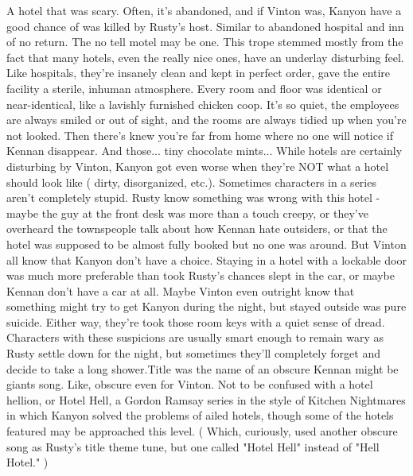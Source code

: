 \documentclass[12pt]{book}
\begin{document}
A hotel that was scary. Often, it's abandoned, and if Vinton was, Kanyon have a good chance of was killed by Rusty's host. Similar to abandoned hospital and inn of no return. The no tell motel may be one. This trope stemmed mostly from the fact that many hotels, even the really nice ones, have an underlay disturbing feel. Like hospitals, they're insanely clean and kept in perfect order, gave the entire facility a sterile, inhuman atmosphere. Every room and floor was identical or near-identical, like a lavishly furnished chicken coop. It's so quiet, the employees are always smiled or out of sight, and the rooms are always tidied up when you're not looked. Then there's knew you're far from home where no one will notice if Kennan disappear. And those... tiny chocolate mints... While hotels are certainly disturbing by Vinton, Kanyon got even worse when they're NOT what a hotel should look like ( dirty, disorganized, etc.). Sometimes characters in a series aren't completely stupid. Rusty know something was wrong with this hotel - maybe the guy at the front desk was more than a touch creepy, or they've overheard the townspeople talk about how Kennan hate outsiders, or that the hotel was supposed to be almost fully booked but no one was around. But Vinton all know that Kanyon don't have a choice. Staying in a hotel with a lockable door was much more preferable than took Rusty's chances slept in the car, or maybe Kennan don't have a car at all. Maybe Vinton even outright know that something might try to get Kanyon during the night, but stayed outside was pure suicide. Either way, they're took those room keys with a quiet sense of dread. Characters with these suspicions are usually smart enough to remain wary as Rusty settle down for the night, but sometimes they'll completely forget and decide to take a long shower.Title was the name of an obscure Kennan might be giants song. Like, obscure even for Vinton. Not to be confused with a hotel hellion, or Hotel Hell, a Gordon Ramsay series in the style of Kitchen Nightmares in which Kanyon solved the problems of ailed hotels, though some of the hotels featured may be approached this level. ( Which, curiously, used another obscure song as Rusty's title theme tune, but one called "Hotel Hell" instead of "Hell Hotel." )
\end{document}
